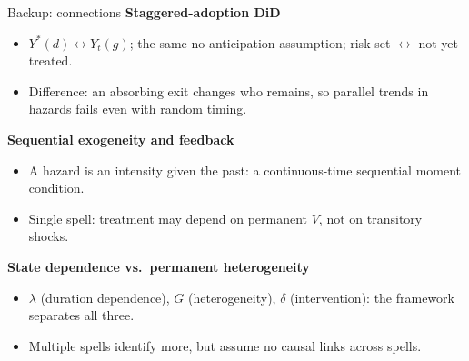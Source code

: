 \documentclass[aspectratio=169,10pt]{beamer}
\begin{document}
\begin{frame}{Backup: connections}
  \textbf{Staggered-adoption DiD}
  \begin{itemize}
    \item $Y^*(d)\leftrightarrow Y_t(g)$; the same no-anticipation assumption; risk set $\leftrightarrow$ not-yet-treated.
    \item Difference: an absorbing exit changes who remains, so parallel trends in hazards fails even with random timing.
  \end{itemize}
  \textbf{Sequential exogeneity and feedback}
  \begin{itemize}
    \item A hazard is an intensity given the past: a continuous-time sequential moment condition.
    \item Single spell: treatment may depend on permanent $V$, not on transitory shocks.
  \end{itemize}
  \textbf{State dependence vs.\ permanent heterogeneity}
  \begin{itemize}
    \item $\lambda$ (duration dependence), $G$ (heterogeneity), $\delta$ (intervention): the framework separates all three.
    \item Multiple spells identify more, but assume no causal links across spells.
  \end{itemize}
\end{frame}
\end{document}

